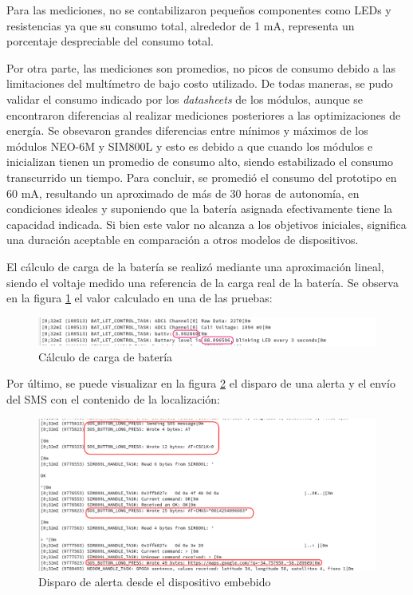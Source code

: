 Para las mediciones, no se contabilizaron pequeños componentes como LEDs y resistencias ya que su consumo total, alrededor de 1 mA, representa un porcentaje despreciable del consumo total.

Por otra parte, las mediciones son promedios, no picos de consumo debido a las limitaciones del multímetro de bajo costo utilizado. De todas maneras, se pudo validar el consumo indicado por los \textit{datasheets} de los módulos, aunque se encontraron diferencias al realizar mediciones posteriores a las optimizaciones de energía. Se obsevaron grandes diferencias entre mínimos y máximos de los módulos NEO-6M y SIM800L y esto es debido a que cuando los módulos e inicializan tienen un promedio de consumo alto, siendo estabilizado el consumo transcurrido un tiempo. Para concluir, se promedió el consumo del prototipo en 60 mA, resultando un aproximado de más de 30 horas de autonomía, en condiciones ideales y suponiendo que la batería asignada efectivamente tiene la capacidad indicada. Si bien este valor no alcanza a los objetivos iniciales, significa una duración aceptable en comparación a otros modelos de dispositivos.


El cálculo de carga de la batería se realizó mediante una aproximación lineal, siendo el voltaje medido una referencia de la carga real de la batería. Se observa en la figura \ref{fig:esp32:bateria} el valor calculado en una de las pruebas:

\begin{figure}[H]
	\centering
	\includegraphics[width=1\textwidth]{./Figures/esp32-battery.png}
	\caption{Cálculo de carga de batería}
	\label{fig:esp32:bateria}
\end{figure}

Por último, se puede visualizar en la figura \ref{fig:esp32:alerta} el disparo de una alerta y el envío del SMS con el contenido de la localización:

\begin{figure}[H]
	\centering
	\includegraphics[width=1\textwidth]{./Figures/esp32-alerta.png}
	\caption{Disparo de alerta desde el dispositivo embebido}
	\label{fig:esp32:alerta}
\end{figure}

